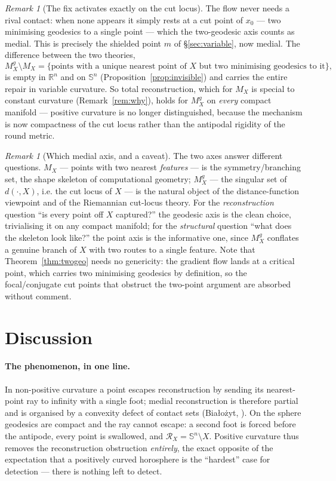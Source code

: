 \documentclass[11pt]{article}
\theoremstyle{remark}
\newtheorem{remark}[theorem]{Remark}
\newcommand{\R}{\mathbb{R}}
\newcommand{\X}{X}
\newcommand{\Mx}{M_{\X}}
\newcommand{\Rx}{\mathcal{R}_{\X}}
\newcommand{\Sn}{\mathbb{S}^{n}}
\begin{document}
\begin{remark}[The fix activates exactly on the cut locus]\label{rem:fix}
The flow never needs a rival contact: when none appears it simply rests at
a cut point of $x_{0}$ --- two minimising geodesics to a single point ---
which the two-geodesic axis counts as medial. This is precisely the
shielded point $m$ of \S\ref{sec:variable}, now medial. The difference between the
two theories,
\[
  \Mx^{g}\setminus\Mx=\{\text{points with a unique nearest point of }\X
  \text{ but two minimising geodesics to it}\},
\]
is empty in $\R^{n}$ and on $\Sn$ (Proposition~\ref{prop:invisible}) and
carries the entire repair in variable curvature. So total reconstruction,
which for $\Mx$ is special to constant curvature
(Remark~\ref{rem:why}), holds for $\Mx^{g}$ on \emph{every} compact
manifold --- positive curvature is no longer distinguished, because the
mechanism is now compactness of the cut locus rather than the antipodal
rigidity of the round metric.
\end{remark}

\begin{remark}[Which medial axis, and a caveat]\label{rem:which}
The two axes answer different questions. $\Mx$ --- points with two nearest
\emph{features} --- is the symmetry/branching set, the shape skeleton of
computational geometry; $\Mx^{g}$ --- the singular set of $d(\cdot,\X)$,
i.e. the cut locus of $\X$ --- is the natural object of the
distance-function viewpoint \cite{Lie} and of the Riemannian cut-locus
theory. For the \emph{reconstruction} question ``is every point off $\X$
captured?'' the geodesic axis is the clean choice, trivialising it on any
compact manifold; for the \emph{structural} question ``what does the
skeleton look like?'' the point axis is the informative one, since
$\Mx^{g}$ conflates a genuine branch of $\X$ with two routes to a single
feature. Note that Theorem~\ref{thm:twogeo} needs no genericity: the
gradient flow lands at a critical point, which carries two minimising
geodesics by definition, so the focal/conjugate cut points that obstruct
the two-point argument are absorbed without comment.
\end{remark}

\section{Discussion}\label{sec:disc}

\paragraph{The phenomenon, in one line.} In non-positive curvature a point
escapes reconstruction by sending its nearest-point ray to infinity with a
single foot; medial reconstruction is therefore partial and is organised
by a convexity defect of contact sets (Bia\l{}o\.zyt, \cite{Bia,R1,R2,R3}).
On the sphere geodesics are compact and the ray cannot escape: a second
foot is forced before the antipode, every point is swallowed, and
$\Rx=\Sn\setminus\X$. Positive curvature thus removes the reconstruction
obstruction \emph{entirely}, the exact opposite of the expectation that a
positively curved horosphere is the ``hardest'' case for detection ---
there is nothing left to detect.
\end{document}
